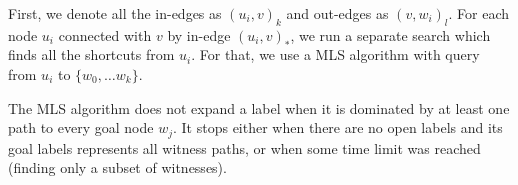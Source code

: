 First, we denote all the in-edges as $(u_i,v)_k$ and out-edges as $(v,w_i)_l$.
For each node $u_i$ connected with $v$ by in-edge $(u_i,v)_*$, we run a
separate search which finds all the shortcuts from $u_i$. For that, we use a
MLS algorithm with query from $u_i$ to $\{w_0,\dots w_k\}$. 

The MLS algorithm does not expand a label when it is dominated by at least one
path to every goal node $w_j$. It stops either when there are no open labels
and its goal labels represents all witness paths, or when some time limit was reached
(finding only a subset of witnesses). 


